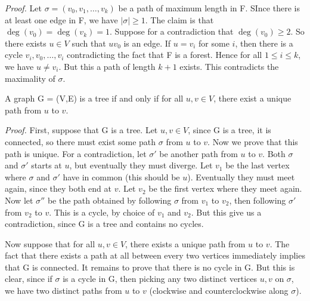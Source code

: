 \documentclass{tufte-handout}
\begin{document}
\textit{Proof.} Let \( \sigma = (v_0, v_1, \ldots, v_k) \) be a path of maximum length in F.
SInce there is at least one edge in F, we have \(\left|\sigma\right| \geq 1\).
The claim is that \( \deg(v_0) = \deg(v_k) = 1 \). Suppose for a contradiction that \( \deg(v_0) \geq 2 \).
So there exists \( u \in V\) such that \( uv_0\) is an edge. If \( u = v_i\) for some \( i \),
then there is a cycle \(v_i, v_0, \ldots, v_i\) contradicting the fact that F is a forest.
Hence for all \( 1 \leq i \leq k \), we have \( u \neq v_i \). But this a path of length \( k+1 \) exists.
This contradicts the maximality of \( \sigma \). \qedsymbol
{}


\begin{Proposition}
    A graph G = (V,E) is a tree if and only if for all \( u,v \in V \), there
    exist a unique path from \( u \) to \( v \).
\end{Proposition}

\textit{Proof.} First, suppose that G is a tree. Let \( u,v \in V \),
since G is a tree, it is connected, so there must exist some path \(\sigma\) from \( u \) to \( v \).
Now we prove that this path is unique. For a contradiction, let \(\sigma'\) be another path from \( u \) to \( v \).
Both \(\sigma\) and \(\sigma'\) starts at \( u \), but eventually they must diverge.
Let \(v_1\) be the last vertex where \(\sigma\) and \(\sigma'\) have in common (this should be \( u \)).
Eventually they must meet again, since they both end at \( v \). Let \( v_2 \) be the first vertex where they meet again.
Now let \(\sigma''\) be the path obtained by following \(\sigma\) from \( v_1 \) to \( v_2 \), then following
\(\sigma'\) from \( v_2 \) to \( v \). This is a cycle, by choice of \( v_1 \) and \( v_2 \).
But this give us a contradiction, since G is a tree and contains no cycles. 

Now suppose that for all \( u,v \in V \), there exists a unique path from \( u \) to \( v \).
The fact that there exists a path at all between every two vertices immediately implies that G is connected.
It remains to prove that there is no cycle in G. But this is clear, since if
\(\sigma\) is a cycle in G, then picking any two distinct vertices \( u,v \) on \(\sigma\),
we have two distinct paths from \( u \) to \( v \) (clockwise and counterclockwise along \(\sigma\)). \qedsymbol
\end{document}
